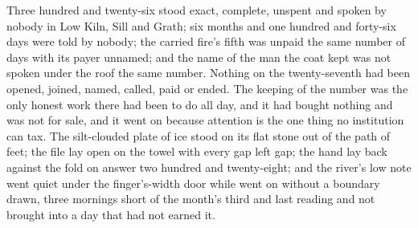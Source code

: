 Three hundred and twenty-six stood exact, complete, unspent and spoken by nobody in Low Kiln, Sill and Grath; six months and one hundred and forty-six days were told by nobody; the carried fire's fifth was unpaid the same number of days with its payer unnamed; and the name of the man the coat kept was not spoken under the roof the same number. Nothing on the twenty-seventh had been opened, joined, named, called, paid or ended. The keeping of the number was the only honest work there had been to do all day, and it had bought nothing and was not for sale, and it went on because attention is the one thing no institution can tax. The silt-clouded plate of ice stood on its flat stone out of the path of feet; the file lay open on the towel with every gap left gap; the hand lay back against the fold on answer two hundred and twenty-eight; and the river's low note went quiet under the finger's-width door while  went on without a boundary drawn, three mornings short of the month's third and last reading and not brought into a day that had not earned it.
